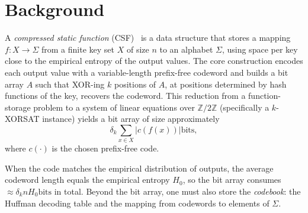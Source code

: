 \section{Background}

A \emph{compressed static function} (CSF)~\cite{hreinsson2009storing} is a data structure
that stores a mapping $f : X \to \Sigma$ from a finite key set $X$ of size $n$ to an
alphabet $\Sigma$, using space per key close to the empirical entropy of the output
values. The core construction encodes each output value with a variable-length
prefix-free codeword and builds a bit array $A$ such that XOR-ing $k$ positions of
$A$, at positions determined by hash functions of the key, recovers the codeword.
This reduction from a function-storage problem to a system of linear equations over
$\mathbb{Z}/2\mathbb{Z}$ (specifically a $k$-XORSAT instance) yields a bit array of
size approximately
\[
    \delta_k \sum_{x \in X} |c(f(x))| \text{bits},
\]
where $c(\cdot)$ is the chosen prefix-free code. 

When the code matches the empirical distribution of outputs, the average codeword
length equals the empirical entropy $H_0$, so the bit array consumes $\approx \delta_k
n H_0 \text{bits}$ in total. Beyond the bit array, one must also store the \emph{codebook}:
the Huffman decoding table and the mapping from codewords to elements of $\Sigma$.

